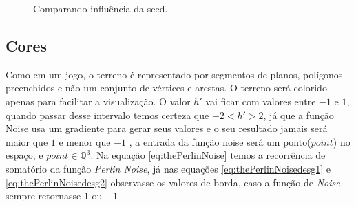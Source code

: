 \begin{figure}[H]
     \centering
     \hspace{0.1cm}
     \hspace{0.1cm}
     \caption{Comparando influência da seed.}
     \label{fig:parametrosSeed}
\end{figure}


\subsection{Cores}
Como em um jogo, o terreno é representado por segmentos de planos, polígonos preenchidos e não um conjunto
de vértices e arestas. O terreno será colorido apenas para facilitar a
visualização. O valor $h'$ vai ficar com valores entre $-1$ e $1$, 
quando passar desse intervalo temos certeza que $-2 < h' > 2$, já que a função Noise 
usa um gradiente para gerar seus valores e o seu resultado jamais será maior que $1$
e menor que $-1$ \cite{perlin1985image}, a entrada da função noise será um ponto($point$) no espaço, e $point \in \mathbb{Q}^{3}$.
Na equação \ref{eq:thePerlinNoise} temos a recorrência de somatório da função
\textit{Perlin Noise}, já nas equações \ref{eq:thePerlinNoisedesg1} e \ref{eq:thePerlinNoisedesg2}
observasse os valores de borda, caso a função de \textit{Noise} sempre retornasse $1$ ou $-1$

